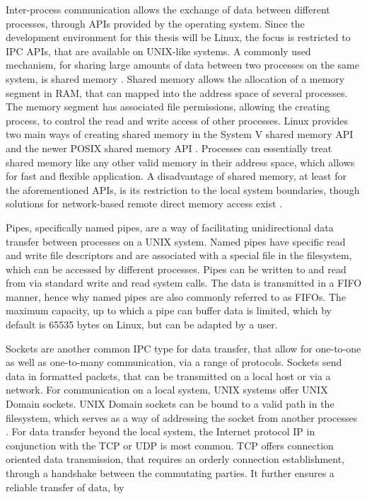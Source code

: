 Inter-process communication allows the exchange of data between different processes, through \acp{API} provided by the operating system. Since the development environment for this thesis will be Linux, the focus is restricted to \ac{IPC} APIs, that are available on UNIX-like systems.
A commonly used mechanism, for sharing large amounts of data between two processes on the same system, is shared memory \cite[p.301ff.]{stevens1998ipc}.
Shared memory allows the allocation of a memory segment in \ac{RAM}, that can mapped into the address space of several processes. The memory segment has associated file permissions, 
allowing the creating process, to control the read and write access of other processes. Linux provides two main ways of creating
shared memory in the System V shared memory \ac{API} and the newer POSIX shared memory \ac{API} \cite{posixshm,systemvshm}. Processes can essentially treat shared memory like 
any other valid memory in their address space, which allows for fast and flexible application. A disadvantage of shared memory, at least for the aforementioned APIs, is its restriction 
to the local system boundaries, though solutions for network-based remote direct memory access exist \cite{recio2007}.
\par 
{}
Pipes, specifically named pipes, are a way of facilitating unidirectional data transfer between processes on a UNIX system. Named pipes have specific read and write file descriptors and are  
associated with a special file in the filesystem, which can be accessed by different processes. Pipes can be written to and read from via standard write and read system calls. The data is transmitted in 
a \ac{FIFO} manner, hence why named pipes are also commonly referred to as FIFOs. The maximum capacity, up to which a pipe can buffer data is limited, which by default is 65535 bytes on Linux, but can be adapted by a user. \cite{pipe}   
\par
{}
Sockets are another common \ac{IPC} type for data transfer, that allow for one-to-one as well as one-to-many 
communication, via a range of protocols\cite[p.57ff.]{stevens1998sock}. Sockets send data in formatted packets, that can be transmitted on a local host or via a network. For communication on a local system, UNIX systems offer UNIX Domain sockets. UNIX Domain sockets can be bound to a valid path in the filesystem, which serves as a way of addressing
the socket from another processes \cite{unixsock}. For data transfer beyond the local system, the Internet protocol \ac{IP} in conjunction with the \ac{TCP} or \ac{UDP} is most common. TCP offers connection oriented data transmission, that requires an orderly connection establishment, through a handshake between the commutating parties. It further ensures a reliable transfer of data, by       
